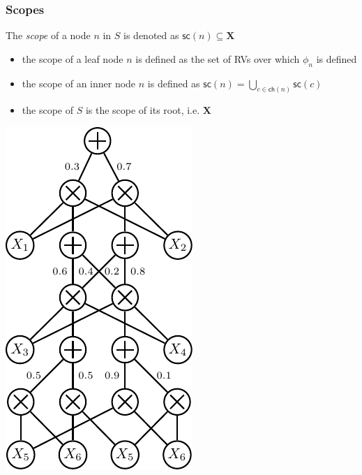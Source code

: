 \documentclass[10pt, t, xcolor={usenames,dvipsnames,svgnames}, compress]{beamer}
\begin{document}
\begin{frame}
  \frametitle{Scopes}
\begin{minipage}{0.55\textwidth}
  The \emph{scope} of a node $n$ in $S$ is denoted as
  $\mathsf{sc}(n)\subseteq\mathbf{X}$
\begin{itemize}
\item   the scope of a leaf node $n$ is defined as the set of RVs over which
  $\phi_{n}$ is defined
\item the scope of an inner node $n$ is defined as
  $\mathsf{sc}(n)=\bigcup_{c\in\mathsf{ch}(n)}\mathsf{sc}(c)$
\item the scope of $S$ is the scope of its root, i.e. $\mathbf{X}$
\end{itemize}
\end{minipage}
\begin{minipage}{0.44\textwidth}
\begin{center}
\includegraphics[width=0.7\columnwidth]{figures/spn-eval.pdf}
\end{center}
\end{minipage}
\end{frame}
\end{document}
